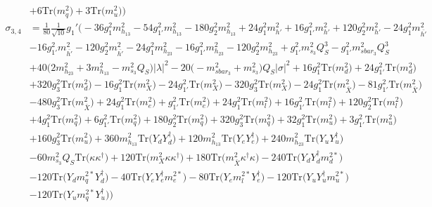 \begin{align}
 &+6 \mbox{Tr}\Big({m_q^2}\Big) +3 \mbox{Tr}\Big({m_u^2}\Big) \Big)\\ 
\sigma_{3,4} & = \frac{1}{80} \frac{1}{\sqrt{10}} g_1' \Big(-36 g_{1}^{2} m_{h_{13}}^2 -54 g_{1'}^{2} m_{h_{13}}^2 -180 g_{2}^{2} m_{h_{13}}^2 +24 g_{1}^{2} m_{h'}^2 +16 g_{1'}^{2} m_{h'}^2 +120 g_{2}^{2} m_{h'}^2 -24 g_{1}^{2} m_{\bar{h'}}^2 \nonumber \\ 
 &-16 g_{1'}^{2} m_{\bar{h'}}^2 -120 g_{2}^{2} m_{\bar{h'}}^2 -24 g_{1}^{2} m_{h_{23}}^2 -16 g_{1'}^{2} m_{h_{23}}^2 -120 g_{2}^{2} m_{h_{23}}^2 +g_{1'}^{2} m_{s_3}^2 Q_{S}^{3} - g_{1'}^{2} m_{sbar_3}^2 Q_{S}^{3} \nonumber \\ 
 &+40 \Big(2 m_{h_{23}}^2  + 3 m_{h_{13}}^2  - m_{s_3}^2 Q_{S} \Big)|\lambda|^2 -20 \Big(- m_{sbar_3}^2  + m_{s_3}^2\Big)Q_{S} |\sigma|^2 +16 g_{1}^{2} \mbox{Tr}\Big({m_d^2}\Big) +24 g_{1'}^{2} \mbox{Tr}\Big({m_d^2}\Big) \nonumber \\ 
 &+320 g_{3}^{2} \mbox{Tr}\Big({m_d^2}\Big) -16 g_{1}^{2} \mbox{Tr}\Big({m_{X}^2}\Big) -24 g_{1'}^{2} \mbox{Tr}\Big({m_{X}^2}\Big) -320 g_{3}^{2} \mbox{Tr}\Big({m_{X}^2}\Big) -24 g_{1}^{2} \mbox{Tr}\Big({m_{\bar{X}}^2}\Big) -81 g_{1'}^{2} \mbox{Tr}\Big({m_{\bar{X}}^2}\Big) \nonumber \\ 
 &-480 g_{3}^{2} \mbox{Tr}\Big({m_{\bar{X}}^2}\Big) +24 g_{1}^{2} \mbox{Tr}\Big({m_e^2}\Big) +g_{1'}^{2} \mbox{Tr}\Big({m_e^2}\Big) +24 g_{1}^{2} \mbox{Tr}\Big({m_l^2}\Big) +16 g_{1'}^{2} \mbox{Tr}\Big({m_l^2}\Big) +120 g_{2}^{2} \mbox{Tr}\Big({m_l^2}\Big) \nonumber \\ 
 &+4 g_{1}^{2} \mbox{Tr}\Big({m_q^2}\Big) +6 g_{1'}^{2} \mbox{Tr}\Big({m_q^2}\Big) +180 g_{2}^{2} \mbox{Tr}\Big({m_q^2}\Big) +320 g_{3}^{2} \mbox{Tr}\Big({m_q^2}\Big) +32 g_{1}^{2} \mbox{Tr}\Big({m_u^2}\Big) +3 g_{1'}^{2} \mbox{Tr}\Big({m_u^2}\Big) \nonumber \\ 
 &+160 g_{3}^{2} \mbox{Tr}\Big({m_u^2}\Big) +360 m_{h_{13}}^2 \mbox{Tr}\Big({Y_d  Y_{d}^{\dagger}}\Big) +120 m_{h_{13}}^2 \mbox{Tr}\Big({Y_e  Y_{e}^{\dagger}}\Big) +240 m_{h_{23}}^2 \mbox{Tr}\Big({Y_u  Y_{u}^{\dagger}}\Big) \nonumber \\ 
 &-60 m_{s_3}^2 Q_{S} \mbox{Tr}\Big({\kappa  \kappa^{\dagger}}\Big) +120 \mbox{Tr}\Big({m_{X}^2  \kappa  \kappa^{\dagger}}\Big) +180 \mbox{Tr}\Big({m_{\bar{X}}^2  \kappa^{\dagger}  \kappa}\Big) -240 \mbox{Tr}\Big({Y_d  Y_{d}^{\dagger}  m_d^{2 *}}\Big) \nonumber \\ 
 &-120 \mbox{Tr}\Big({Y_d  m_q^{2 *}  Y_{d}^{\dagger}}\Big) -40 \mbox{Tr}\Big({Y_e  Y_{e}^{\dagger}  m_e^{2 *}}\Big) -80 \mbox{Tr}\Big({Y_e  m_l^{2 *}  Y_{e}^{\dagger}}\Big) -120 \mbox{Tr}\Big({Y_u  Y_{u}^{\dagger}  m_u^{2 *}}\Big) \nonumber \\ 
 &-120 \mbox{Tr}\Big({Y_u  m_q^{2 *}  Y_{u}^{\dagger}}\Big) \Big)
\end{align} 

